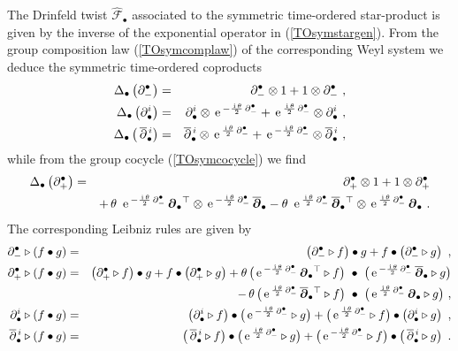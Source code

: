 \documentclass[11pt,a4paper]{article}
\newcommand{\1}{\mathbb{1}}
\newcommand{\mbf}[1]{{\boldsymbol {#1} }}
\def\ii{{\,{\rm i}\,}}
\def\mdell{{\mbf\partial}}
\def\e{{\,\rm e}\,}
\def\bea{\begin{eqnarray}}
\def\eea{\end{eqnarray}}
\newcommand{\eeq}{\end{eqnarray}}
\begin{document}
The Drinfeld twist $\hat{\mathcal F}_\bullet$ associated to the
symmetric time-ordered star-product is given by the inverse of the
exponential operator in (\ref{TOsymstargen}). From the group
composition law (\ref{TOsymcomplaw}) of the corresponding Weyl system
we deduce the symmetric time-ordered coproducts
\bea
\Delta_\bullet\left(\partial_-^\bullet\right)&=&\partial_-^\bullet
\otimes1+1\otimes\partial_-^\bullet \ , \nonumber\\
\Delta_\bullet\left(\partial^i_\bullet\right)&=&\partial^i_\bullet\otimes
\e^{-\frac{\ii\theta}2\,\partial_-^\bullet}+\e^{\frac{\ii\theta}2\,
\partial_-^\bullet}\otimes\partial^i_\bullet \ , \nonumber\\
\Delta_\bullet\left(\,\overline{\partial}{}^{\,i}_\bullet\right)&=&
\overline{\partial}{}^{\,i}_\bullet\otimes
\e^{\frac{\ii\theta}2\,\partial_-^\bullet}+\e^{-\frac{\ii\theta}2\,
\partial_-^\bullet}\otimes\overline{\partial}{}^{\,i}_\bullet \ ,
\label{STOcoprods}\eeq
while from the group cocycle (\ref{TOsymcocycle}) we find
\bea
\Delta_\bullet\left(\partial_+^\bullet\right)&=&\partial_+^\bullet\otimes1+
1\otimes\partial_+^\bullet\nonumber\\ &&
+\,\theta~\e^{-\frac{\ii\theta}2\,
\partial_-^\bullet}\,\mdell_\bullet{}^\top\otimes
\e^{-\frac{\ii\theta}2\,\partial_-^\bullet}\,\overline{\mdell}_\bullet-
\theta~\e^{\frac{\ii\theta}2\,\partial_-^\bullet}\,
\overline{\mdell}_\bullet{}^\top\otimes\e^{\frac{\ii\theta}2\,
\partial_-^\bullet}\,\mdell_\bullet \ .
\label{STOcoprodtime}\eea
The corresponding Leibniz rules are given by
\bea
\partial_-^\bullet\triangleright(f\bullet g)&=&
\left(\partial_-^\bullet\triangleright f\right)\bullet g+
f\bullet\left(\partial_-^\bullet\triangleright g\right) \ ,
\nonumber\\ \partial_+^\bullet\triangleright(f\bullet g)&=&
\left(\partial_+^\bullet\triangleright f\right)\bullet g+
f\bullet\left(\partial_+^\bullet\triangleright g\right)
+\theta\,\bigl(\e^{-\frac{\ii\theta}2\,\partial_-^\bullet}\,
\mdell_\bullet{}^\top\triangleright f\bigr)~\bullet~\bigl(
\e^{-\frac{\ii\theta}2\,\partial_-^\bullet}\,
\overline{\mdell}_\bullet\triangleright g\bigr) \nonumber\\ &&
\qquad\qquad\qquad\qquad\qquad\qquad -\,
\theta\,\bigl(\e^{\frac{\ii\theta}2\,\partial_-^\bullet}\,
\overline{\mdell}_\bullet{}^\top\triangleright f\bigr)~\bullet~
\bigl(\e^{\frac{\ii\theta}2\,\partial_-^\bullet}\,\mdell_\bullet
\triangleright g\bigr) \ , \nonumber\\
\partial^i_\bullet\triangleright(f\bullet g)&=&\left(\partial^i_\bullet
\triangleright f\right)\bullet\bigl(\e^{-\frac{\ii\theta}2\,
\partial_-^\bullet}\triangleright g\bigr)+\bigl(
\e^{\frac{\ii\theta}2\,\partial_-^\bullet}\triangleright f
\bigr)\bullet\left(\partial^i_\bullet\triangleright g\right) \ ,
\nonumber\\ \overline{\partial}{}^{\,i}_\bullet\triangleright(f\bullet g)
&=&\left(\,\overline{\partial}{}^{\,i}_\bullet
\triangleright f\right)\bullet\bigl(\e^{\frac{\ii\theta}2\,
\partial_-^\bullet}\triangleright g\bigr)+\bigl(
\e^{-\frac{\ii\theta}2\,\partial_-^\bullet}\triangleright f
\bigr)\bullet\left(\,\overline{\partial}{}^{\,i}_\bullet\triangleright g\right)
\ .
\label{STOLeibniz}\eea
\end{document}

